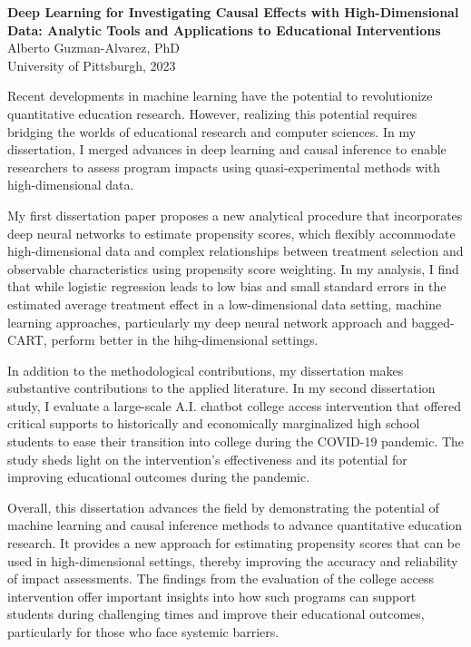 \pagestyle{plain}

\begin{center}

\textbf{Deep Learning for Investigating Causal Effects with High-Dimensional Data: Analytic Tools and Applications to Educational Interventions}\\
        Alberto Guzman-Alvarez, PhD\\
        University of Pittsburgh, 2023\\
    \end{center}
       \vspace*{3\baselineskip}

Recent developments in machine learning have the potential to revolutionize quantitative education research. However, realizing this potential requires bridging the worlds of educational research and computer sciences. In my dissertation, I merged advances in deep learning and causal inference to enable researchers to assess program impacts using quasi-experimental methods with high-dimensional data.

My first dissertation paper proposes a new analytical procedure that incorporates deep neural networks to estimate propensity scores, which flexibly accommodate high-dimensional data and complex relationships between treatment selection and observable characteristics using propensity score weighting. In my analysis, I find that while logistic regression leads to low bias and small standard errors in the estimated average treatment effect in a low-dimensional data setting, machine learning approaches, particularly my deep neural network approach and bagged-CART, perform better in the hihg-dimensional settings.

In addition to the methodological contributions, my dissertation makes substantive contributions to the applied literature. In my second dissertation study, I evaluate a large-scale A.I. chatbot college access intervention that offered critical supports to historically and economically marginalized high school students to ease their transition into college during the COVID-19 pandemic. The study sheds light on the intervention's effectiveness and its potential for improving educational outcomes during the pandemic.

Overall, this dissertation advances the field by demonstrating the potential of machine learning and causal inference methods to advance quantitative education research. It provides a new approach for estimating propensity scores that can be used in high-dimensional settings, thereby improving the accuracy and reliability of impact assessments. The findings from the evaluation of the college access intervention offer important insights into how such programs can support students during challenging times and improve their educational outcomes, particularly for those who face systemic barriers.

\newpage